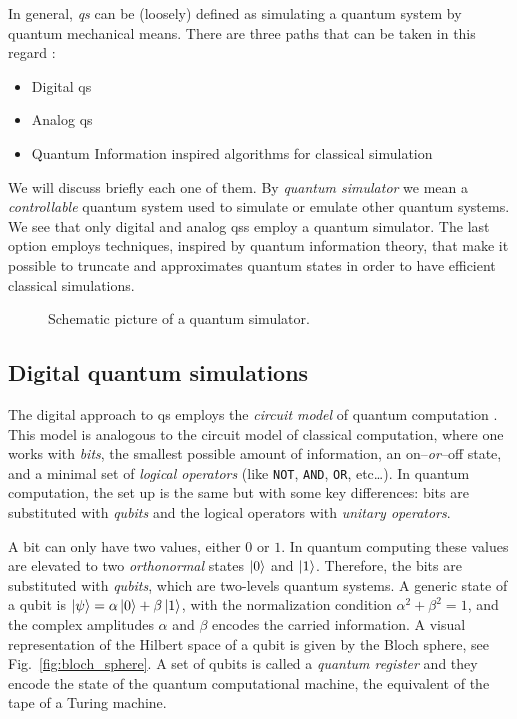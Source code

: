 In general, \emph{\acf{qs}} can be (loosely) defined as simulating a quantum system by quantum mechanical means.
There are three paths that can be taken in this regard \cite{georgescu2014simulation}:
\begin{itemize}
    \item Digital \acl{qs}
    \item Analog \acl{qs}
    \item Quantum Information inspired algorithms for classical simulation
\end{itemize}
We will discuss briefly each one of them.
By \emph{quantum simulator} we mean a \emph{controllable} quantum system used to simulate or emulate other quantum systems.
We see that only digital and analog \ac{qs}s employ a quantum simulator.
The last option employs techniques, inspired by quantum information theory, that make it possible to truncate and approximates quantum states in order to have efficient classical simulations.


\begin{figure}[t]
    \centering
    
    \caption{Schematic picture of a quantum simulator.}
\end{figure}


%
%
\subsection{Digital quantum simulations}
\label{sub:digital_quantum_simulations}

The digital approach to \ac{qs} employs the \emph{circuit model} of quantum computation \cite{nielsen2010quantum, deutsch1989quantum}.
This model is analogous to the circuit model of classical computation, where one works with \emph{bits}, the smallest possible amount of information, an on--\emph{or}--off state, and a minimal set of \emph{logical operators} (like \texttt{NOT}, \texttt{AND}, \texttt{OR}, etc\dots).
In quantum computation, the set up is the same but with some key differences:
bits are substituted with \emph{qubits} and the logical operators with \emph{unitary operators}.

A bit can only have two values, either $0$ or $1$.
In quantum computing these values are elevated to two \emph{orthonormal} states $\ket{0}$ and $\ket{1}$.
Therefore, the bits are substituted with \emph{qubits}, which are two-levels quantum systems.
A generic state of a qubit is $\ket{\psi} = \alpha \ket{0} + \beta \ket{1}$, with the normalization condition $\alpha^2 + \beta^2 = 1$, and the complex amplitudes $\alpha$ and $\beta$ encodes the carried information.
A visual representation of the Hilbert space of a qubit is given by the Bloch sphere, see Fig.~\ref{fig:bloch_sphere}.
A set of qubits is called a \emph{quantum register} and they encode the state of the quantum computational machine, the equivalent of the tape of a Turing machine.


